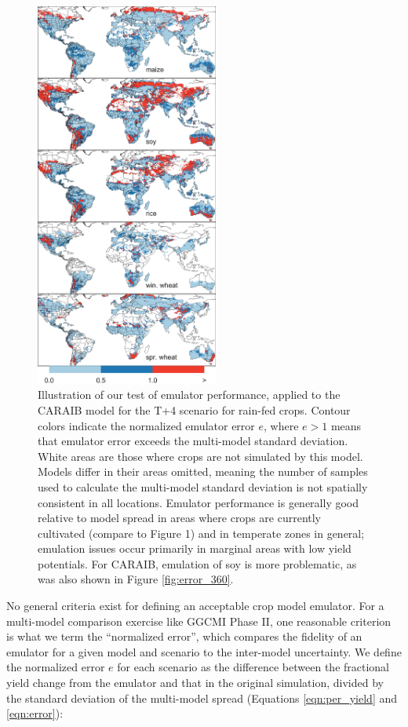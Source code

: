 \documentclass[esd, final]{copernicus} %
\begin{document}
\begin{figure}[h]
\centering
    \includegraphics[width=6cm]{figures/em_err.png}
    \caption{Illustration of our test of emulator performance, applied to the CARAIB model for the T+4 scenario for rain-fed crops. Contour colors indicate the normalized emulator error $e$, where $e > 1$ means that emulator error exceeds the multi-model standard deviation. White areas are those where crops are not simulated by this model. Models differ in their areas omitted, meaning the number of samples used to calculate the multi-model standard deviation is not spatially consistent in all locations. Emulator performance is generally good relative to model spread in areas where crops are currently cultivated (compare to Figure 1) and in temperate zones in general; emulation issues occur primarily in marginal areas with low yield potentials. For CARAIB, emulation of soy is more problematic, as was also shown in Figure \ref{fig:error_360}.}
   \label{fig:error}
\end{figure}

No general criteria exist for defining an acceptable crop model emulator. For a multi-model comparison exercise like GGCMI Phase II, one reasonable criterion is what we term the ``normalized error'', which compares the fidelity of an emulator for a given model and scenario to the inter-model uncertainty. We define the normalized error $e$ for each scenario as the difference between the fractional yield change from the emulator and that in the original simulation, divided by the standard deviation of the multi-model spread (Equations \ref{eqn:per_yield} and  \ref{eqn:error}):
\end{document}
